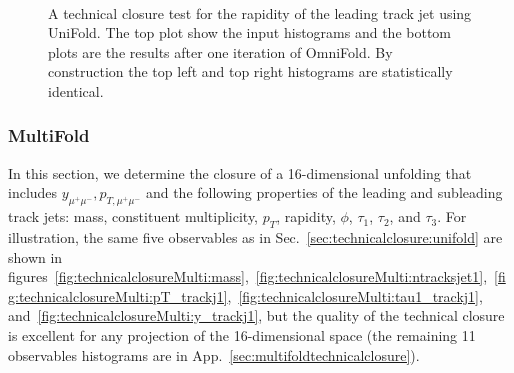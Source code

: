 \begin{figure}[h!]
\centering
{}\\
\caption{A technical closure test for the rapidity of the leading track jet using UniFold.  The top plot show the input histograms and the bottom plots are the results after one iteration of OmniFold.  By construction the top left and top right histograms are statistically identical.}
\label{fig:technicalclosure:y_trackj1}
\end{figure}

\subsubsection{MultiFold}
\label{sec:technicalclosure:multifold}

In this section, we determine the closure of a 16-dimensional unfolding that includes $y_{\mu^+\mu^-},p_{T,\mu^+\mu^-}$ and the following properties of the leading and subleading track jets: mass, constituent multiplicity, $p_T$, rapidity, $\phi$, $\tau_1$, $\tau_2$, and $\tau_3$.  For illustration, the same five observables as in Sec.~\ref{sec:technicalclosure:unifold} are shown in figures~\ref{fig:technicalclosureMulti:mass},~\ref{fig:technicalclosureMulti:ntracksjet1},~\ref{fig:technicalclosureMulti:pT_trackj1},~\ref{fig:technicalclosureMulti:tau1_trackj1}, and~\ref{fig:technicalclosureMulti:y_trackj1}, but the quality of the technical closure is excellent for any projection of the 16-dimensional space (the remaining 11 observables histograms are in App.~\ref{sec:multifoldtechnicalclosure}).

